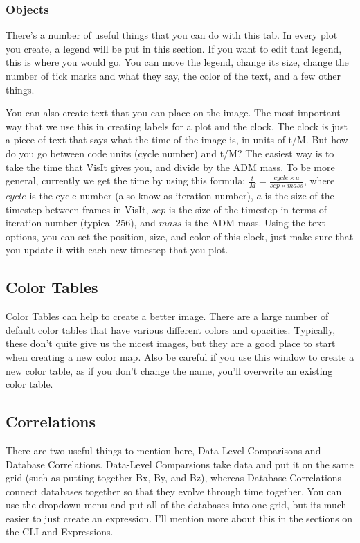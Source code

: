 \documentclass[english]{article}
\begin{document}
        \subsubsection{Objects}
        There's a number of useful things that you can do with this tab. In every plot you create, a legend
        will be put in this section. If you want to edit that legend, this is where you would go. You can 
        move the legend, change its size, change the number of tick marks and what they say, the color of
        the text, and a few other things.

        You can also create text that you can place on the image. The most important way that we use this
        in creating labels for a plot and the clock. The clock is just a piece of text that says what the
        time of the image is, in units of t/M. But how do you go between code units (cycle number) and
        t/M? The easiest way is to take the time that VisIt gives you, and divide by the ADM mass. To be
        more general, currently we get the time by using this formula: $\frac{t}{M} = \frac{cycle \times 
        a}{sep \times mass}$, where $cycle$ is the cycle number (also know as iteration number), $a$ 
        is the size of the timestep between frames in VisIt, $sep$ is the size of the timestep in terms 
        of iteration number (typical 256), and $mass$ is the ADM mass. Using the text options, you can 
        set the position, size, and color of this clock, just make sure that you update it with each new 
        timestep that you plot.   

    \subsection{Color Tables}
    Color Tables can help to create a better image. There are a large number of default color tables that
    have various different colors and opacities. Typically, these don't quite give us the nicest images,
    but they are a good place to start when creating a new color map. Also be careful if you use this 
    window to create a new color table, as if you don't change the name, you'll overwrite an existing
    color table.
    

    \subsection{Correlations}
    There are two useful things to mention here, Data-Level Comparisons and Database Correlations.
    Data-Level Comparsions take data and put it on the same grid (such as putting together Bx, By, and Bz),
    whereas Database Correlations connect databases together so that they evolve through time together.
    You can use the dropdown menu and put all of the databases into one grid, but its much easier to just
    create an expression. I'll mention more about this in the sections on the CLI and Expressions.
\end{document}
